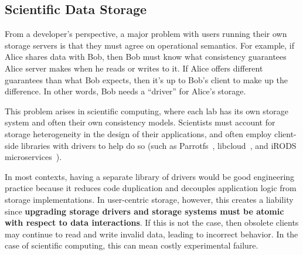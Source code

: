 

\subsection{Scientific Data Storage}

From a developer's perspective, a major problem with users running their own
storage servers is that they must agree on operational semantics.  For example, if Alice shares data
with Bob, then Bob must know what consistency guarantees Alice server makes when
he reads or writes to it.  If Alice offers different guarantees than what Bob
expects, then it's up to Bob's client to make up the difference.  In other
words, Bob needs a ``driver'' for Alice's storage.


This problem arises in scientific computing, where each lab has its own storage
system and often their own consistency models.  Scientists must account for
storage heterogeneity in the design of their applications, and often employ
client-side libraries with drivers to help do so (such as Parrotfs~\cite{parrotfs},
libcloud~\cite{libcloud}, and iRODS microservices~\cite{irods}).

In most contexts, having a separate library of drivers would be
good engineering practice because it reduces code duplication and decouples
application logic from storage implementations.  In user-centric storage,
however, this creates a liability since \textbf{upgrading storage drivers and
storage systems must be atomic with respect to data interactions}.  If this is
not the case, then obsolete clients may continue to read and write invalid data,
leading to incorrect behavior.  In the case of scientific computing, this can
mean costly experimental failure.

